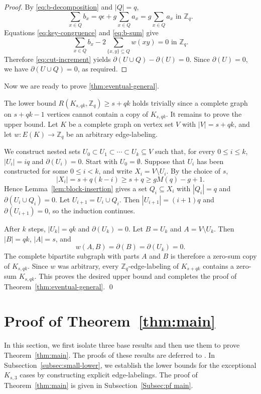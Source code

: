 ﻿\documentclass[11pt]{article}
\numberwithin{equation}{section}
\theoremstyle{remark}
\newcommand{\Z}{\mathbb Z}
\begin{document}
\begin{proof}
    By \eqref{eq:b-decomposition} and $|Q|=q$,
    \begin{equation}\label{eq:b-sum}
        \sum_{x\in Q}b_x=q\epsilon+g\sum_{x\in Q}a_x=g\sum_{x\in Q}a_x
        \text{ in }\Z_q.
    \end{equation}
    Equations \eqref{eq:key-congruence} and \eqref{eq:b-sum} give
    \[
        \sum_{x\in Q}b_x-2\sum_{\{x,y\}\subseteq Q}w(xy)=0
        \text{ in }\Z_q.
    \]
    Therefore \eqref{eq:cut-increment} yields $\partial(U\cup Q)-\partial(U)=0$.
    Since $\partial(U)=0$, we have $\partial(U\cup Q)=0$, as required.
\end{proof}

Now we are ready to prove \cref{thm:eventual-general}.

\medskip

The lower bound $R(K_{s,qk},\Z_q)\ge s+qk$ holds trivially since a complete graph on $s+qk-1$ vertices cannot contain a copy of $K_{s,qk}$.
It remains to prove the upper bound.
Let $K$ be a complete graph on vertex set $V$ with $|V|=s+qk$, and let $w\colon E(K)\to\Z_q$ be an arbitrary edge-labeling.

We construct nested sets $U_0\subset U_1\subset\cdots\subset U_k\subseteq V$ such that, for every $0\le i\le k$, $|U_i|=iq$ and $\partial(U_i)=0$.
Start with $U_0=\emptyset$.
Suppose that $U_i$ has been constructed for some $0\le i<k$, and write $X_i=V\setminus U_i$.
By the choice of $s$,
\[
    |X_i|=s+q(k-i)\ge s+q\ge gM(q)-g+1.
\]
Hence Lemma~\ref{lem:block-insertion} gives a set $Q_i\subseteq X_i$ with $|Q_i|=q$ and $\partial(U_i\cup Q_i)=0$.
Let $U_{i+1}=U_i\cup Q_i$.
Then $|U_{i+1}|=(i+1)q$ and $\partial(U_{i+1})=0$, so the induction continues.

After $k$ steps, $|U_k|=qk$ and $\partial(U_k)=0$.
Let $B=U_k$ and $A=V\setminus U_k$.
Then $|B|=qk$, $|A|=s$, and
\[
    w(A,B)=\partial(B)=\partial(U_k)=0.
\]
The complete bipartite subgraph with parts $A$ and $B$ is therefore a zero-sum copy of $K_{s,qk}$.
Since $w$ was arbitrary, every $\Z_q$-edge-labeling of $K_{s+qk}$ contains a zero-sum $K_{s,qk}$. This proves the desired upper bound and completes the proof of Theorem~\ref{thm:eventual-general}. \qed


\section{Proof of Theorem~\ref{thm:main}}\label{sec:main-proof}

In this section, we first isolate three base results and then use them to prove Theorem~\ref{thm:main}. The proofs of these results are deferred to .
In Subsection~\ref{subsec:small-lower}, we establish the lower bounds for the exceptional $K_{s,3}$ cases by constructing explicit edge-labelings.
The proof of Theorem~\ref{thm:main} is given in Subsection~\ref{Subsec:pf main}.
\end{document}
